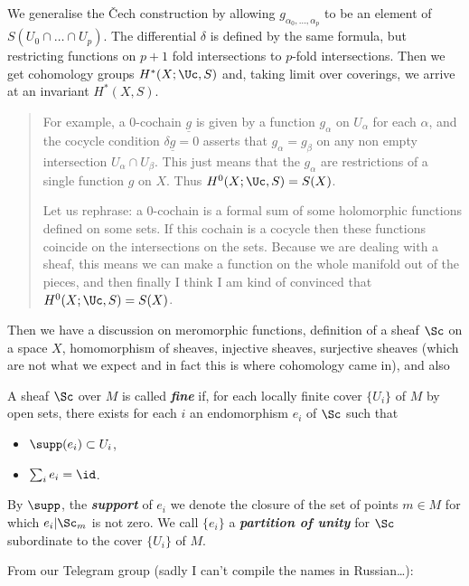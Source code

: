 We generalise the \v Cech construction by allowing $g_{\alpha_0,\ldots,\alpha_p}$ to be an element of $S(U_0\cap\ldots\cap U_p)$. The differential $\delta$ is defined by the same formula, but restricting functions on $p+1$ fold intersections to $p$-fold intersections.  Then we get cohomology groups $H^*(X;\Uc,S)$ and, taking limit over coverings, we arrive at an invariant $H^*(X,S)$.

\begin{quote}
	For example, a 0-cochain $\underline{g}$ is given by a function $g_\alpha$ on $U_\alpha$ for each $\alpha$, and the cocycle condition $\delta\underline{g}=0$ asserts that $g_\alpha=g_\beta$ on any non empty intersection $U_\alpha\cap U_\beta$. This just means that the $g_\alpha$ are restrictions of a single function $g$ on $X$. Thus $H^0(X;\Uc,S)=S(X)$.
	
	{\color{cyan}Let us rephrase: a 0-cochain is a formal sum of some holomorphic functions defined on some sets. If this cochain is a cocycle then these functions coincide on the intersections on the sets. Because we are dealing with a sheaf, this means we can make a function on the whole manifold out of the pieces,} {\color{magenta}and then finally I think I am kind of convinced that $H^0(X;\Uc,S)=S(X)$.}
\end{quote}
{\color{cyan}Then we have a discussion on meromorphic functions, definition of a sheaf $\Sc$ on a space $X$, homomorphism of sheaves, injective sheaves, surjective sheaves (which are not what we expect and in fact this is where cohomology came in), and also}
\begin{defn}
	A sheaf $\Sc$ over $M$ is called \textbf{\textit{fine}} if, for each locally finite cover $\{U_i\}$ of $M$ by open sets, there exists for each $i$ an endomorphism $e_i$ of $\Sc$ such that
	\begin{itemize}
		\item $\supp(e_i)\subset U_i$,
		\item $\sum_ie_i=\id$.
	\end{itemize}
	By $\supp$, the \textbf{\textit{support}} of $e_i$ we denote the closure of the set of points $m\in M$ for which $e_i|\Sc_m$ is not zero. We call $\{e_i\}$ a \textbf{\textit{partition of unity}} for $\Sc$ subordinate to the cover $\{U_i\}$ of $M$.
\end{defn}
From our Telegram group (sadly I can't compile the names in Russian…):
